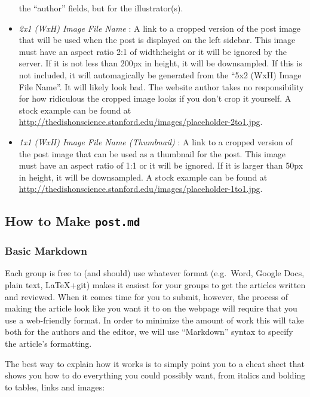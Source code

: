 \documentclass[paper=a4, fontsize=11pt]{scrartcl}
\numberwithin{equation}{section}        %
\numberwithin{figure}{section}            %
\numberwithin{table}{section}                %
\newcommand{\dishurlplain}[1]{http://thedishonscience.stanford.edu/#1}
\newcommand{\dishurl}[1]{\url{\dishurlplain{#1}}}
\begin{document}
\begin{itemize}
        the ``author'' fields, but for the illustrator(s).
    \item \emph{2x1 (WxH) Image File Name} : A link to a cropped version of the post image that
        will be used when the post is displayed on the left sidebar. This image
        must have an aspect ratio 2:1 of width:height or it will be ignored by
        the server. If it is not less than
        200px in height, it will be downsampled. If this is not included, it
        will automagically be generated from the ``5x2 (WxH) Image File Name''.
        It will likely look bad. The website author takes no responsibility for
        how ridiculous the cropped image looks if you don't crop it yourself. A stock
        example can be found at
        \dishurl{images/placeholder-2to1.jpg}.
    \item \emph{1x1 (WxH) Image File Name (Thumbnail)} : A link to a cropped version of the post image
        that can be used as a thumbnail for the post. This image must have an
        aspect ratio of 1:1 or it will be ignored. If it is larger than 50px in
        height, it will be downsampled. A stock
        example can be found at
        \dishurl{images/placeholder-1to1.jpg}.

\end{itemize}

\subsection{How to Make \texttt{\textbf{post.md}}}\label{sec:markdown}

\subsubsection{Basic Markdown}

Each group is free to (and should) use whatever format (e.g.\ Word, Google Docs, plain text,
LaTeX+git) makes it easiest for your groups to get the articles written and
reviewed. When it comes time for you to submit, however, the process of making
the article look like you want it to on the webpage will require that you use a web-friendly
format. In order to minimize the amount of work this will take both for the
authors and the editor, we will use ``Markdown'' syntax to specify the article's
formatting.

The best way to explain how it works is to simply point you to a cheat
sheet that shows you how to do everything you could possibly want,
from italics and bolding to tables, links and images:
\end{document}
